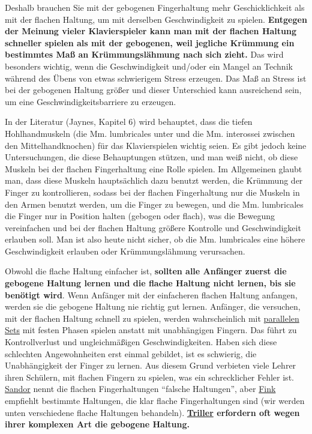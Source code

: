 Deshalb brauchen Sie mit der gebogenen Fingerhaltung mehr Geschicklichkeit als mit der flachen Haltung, um mit derselben Geschwindigkeit zu spielen.
\textbf{Entgegen der Meinung vieler Klavierspieler kann man mit der flachen Haltung schneller spielen als mit der gebogenen, weil jegliche Krümmung ein bestimmtes Maß an Krümmungslähmung nach sich zieht.}
Das wird besonders wichtig, wenn die Geschwindigkeit und/oder ein Mangel an Technik während des Übens von etwas schwierigem Stress erzeugen.
Das Maß an Stress ist bei der gebogenen Haltung größer und dieser Unterschied kann ausreichend sein, um eine Geschwindigkeitsbarriere zu erzeugen.

In der Literatur (Jaynes, Kapitel 6) wird behauptet, dass die tiefen Hohlhandmuskeln (die Mm. lumbricales unter und die Mm. interossei zwischen den Mittelhandknochen) für das Klavierspielen wichtig seien.
Es gibt jedoch keine Untersuchungen, die diese Behauptungen stützen, und man weiß nicht, ob diese Muskeln bei der flachen Fingerhaltung eine Rolle spielen.
Im Allgemeinen glaubt man, dass diese Muskeln hauptsächlich dazu benutzt werden, die Krümmung der Finger zu kontrollieren, sodass bei der flachen Fingerhaltung nur die Muskeln in den Armen benutzt werden, um die Finger zu bewegen, und die Mm. lumbricales die Finger nur in Position halten (gebogen oder flach), was die Bewegung vereinfachen und bei der flachen Haltung größere Kontrolle und Geschwindigkeit erlauben soll.
Man ist also heute nicht sicher, ob die Mm. lumbricales eine höhere Geschwindigkeit erlauben oder Krümmungslähmung verursachen.

Obwohl die flache Haltung einfacher ist, \textbf{sollten alle Anfänger zuerst die gebogene Haltung lernen und die flache Haltung nicht lernen, bis sie benötigt wird}.
Wenn Anfänger mit der einfacheren flachen Haltung anfangen, werden sie die gebogene Haltung nie richtig gut lernen.
Anfänger, die versuchen, mit der flachen Haltung schnell zu spielen, werden wahrscheinlich mit \hyperref[c1ii11]{parallelen Sets} mit festen Phasen spielen anstatt mit unabhängigen Fingern.
Das führt zu Kontrollverlust und ungleichmäßigen Geschwindigkeiten.
Haben sich diese schlechten Angewohnheiten erst einmal gebildet, ist es schwierig, die Unabhängigkeit der Finger zu lernen.
Aus diesem Grund verbieten viele Lehrer ihren Schülern, mit flachen Fingern zu spielen, was ein schrecklicher Fehler ist.
\hyperref[Sandor]{Sandor} nennt die flachen Fingerhaltungen \enquote{falsche Haltungen}, aber \hyperref[Fink]{Fink} empfiehlt bestimmte Haltungen, die klar flache Fingerhaltungen sind (wir werden unten verschiedene flache Haltungen behandeln).
\textbf{\hyperref[c1iii3]{Triller} erfordern oft wegen ihrer komplexen Art die gebogene Haltung.}

